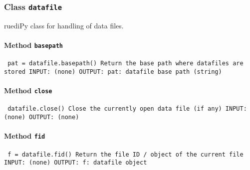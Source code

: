 \subsubsection{Class \texttt{datafile}}
\par
ruediPy class for handling of data files.\par

\paragraph{Method \texttt{basepath}}
\vspace{1ex}
\texttt{\newline
pat = datafile.basepath()\newline
\newline
Return the base path where datafiles are stored\newline
\newline
INPUT:\newline
(none)\newline
\newline
OUTPUT:\newline
pat: datafile base path (string)\newline
\newline
}

\paragraph{Method \texttt{close}}
\vspace{1ex}
\texttt{\newline
datafile.close()\newline
\newline
Close the currently open data file (if any)\newline
\newline
INPUT:\newline
(none)\newline
\newline
OUTPUT:\newline
(none)\newline
\newline
}

\paragraph{Method \texttt{fid}}
\vspace{1ex}
\texttt{\newline
f = datafile.fid()\newline
\newline
Return the file ID / object of the current file\newline
\newline
INPUT:\newline
(none)\newline
\newline
OUTPUT:\newline
f: datafile object\newline
\newline
}

